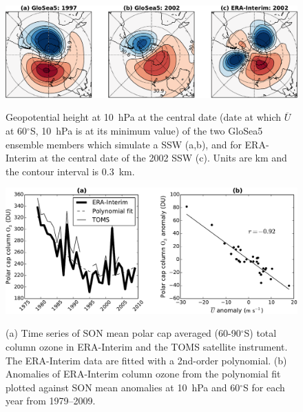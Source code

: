 \begin{figure}[t]
  \noindent\includegraphics[width=\textwidth,angle=0]{figures/GloSea5/ssws_crop.pdf}\\
  \caption[Comparison of GloSea5 and observed SSWs.]{Geopotential height at 10~hPa at the central  date (date at which $\overline{U}$ at 60$^{\circ}$S, 10~hPa is at its minimum value) of the two GloSea5 ensemble members which simulate a SSW (a,b), and for ERA-Interim at the central date of the 2002 SSW (c). Units are km and the contour interval is 0.3~km.}\label{Fig3}
\end{figure}

\begin{figure}[t]
  \noindent\includegraphics[width=\textwidth,angle=0]{figures/GloSea5/zmzw_ozone_scatter_crop.pdf}\\
  \caption[Relation between stratospheric polar vortex strenth and column ozone.]{(a) Time series of SON mean polar cap averaged (60-90$^{\circ}$S) total column ozone in ERA-Interim and the TOMS satellite instrument. The ERA-Interim data are fitted with a 2nd-order polynomial. (b) Anomalies of ERA-Interim column ozone from the polynomial fit plotted against SON mean anomalies at 10~hPa and 60$^{\circ}$S for each year from 1979--2009.}\label{Fig4}
\end{figure}

